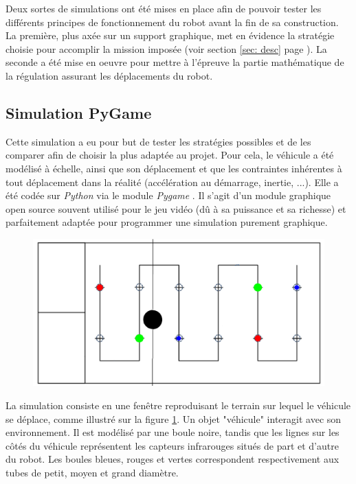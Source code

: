 \documentclass[a4paper,11pt]{article}
\begin{document}
Deux sortes de simulations ont été mises en place afin de pouvoir tester les différents principes de fonctionnement du robot avant la fin de sa construction. La première, plus axée sur un support graphique, met en évidence la stratégie choisie pour accomplir la mission imposée (voir section \ref{sec: desc} page \pageref{sec: desc}). La seconde a été mise en oeuvre pour mettre à l'épreuve la partie mathématique de la régulation assurant les déplacements du robot.

\subsection{Simulation PyGame}

Cette simulation a eu pour but de tester les stratégies possibles et de les comparer afin de choisir la plus adaptée au projet. Pour cela, le véhicule a été modélisé à échelle, ainsi que son déplacement et que les contraintes inhérentes à tout déplacement dans la réalité (accélération au démarrage, inertie, ...). Elle a été codée sur \textit{Python} via le module \textit{Pygame} \cite{pyginf}. Il s'agit d'un module graphique open source souvent utilisé pour le jeu vidéo \cite{pygjeu} (dû à sa puissance et sa richesse) et parfaitement adaptée pour programmer une simulation purement graphique.

\begin{figure}[H]
    \centering
    \includegraphics[scale = 0.2]{simu_cyl.png}
    \label{vehmouv}
\end{figure}

La simulation consiste en une fenêtre reproduisant le terrain sur lequel le véhicule se déplace, comme illustré sur la figure \ref{vehmouv}. Un objet "véhicule" interagit avec son environnement. Il est modélisé par une boule noire, tandis que les lignes sur les côtés du véhicule représentent les capteurs infrarouges situés de part et d'autre du robot. Les boules bleues, rouges et vertes correspondent respectivement aux tubes de petit, moyen et grand diamètre.
 
\end{document}
